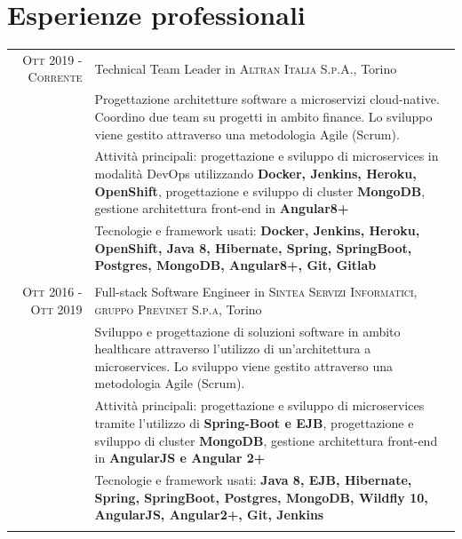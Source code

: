 \documentclass[a4paper,10pt]{article} %
\begin{document}

\section{Esperienze professionali}

\begin{tabular}{r|p{11cm}}
\textsc{Ott 2019 - Corrente} & Technical Team Leader in \textsc{Altran Italia S.p.A.}, Torino \emph{}\\
& \footnotesize{Progettazione architetture software a microservizi cloud-native. Coordino due team su progetti in ambito finance. Lo sviluppo viene gestito attraverso una metodologia Agile (Scrum).}\\
& \footnotesize{Attività principali: progettazione e sviluppo di microservices in modalità DevOps utilizzando \textbf{Docker, Jenkins, Heroku, OpenShift}, progettazione e sviluppo di cluster \textbf{MongoDB}, gestione architettura front-end in \textbf{Angular8+} }\\
& \footnotesize{Tecnologie e framework usati: \textbf{Docker, Jenkins, Heroku, OpenShift, Java 8, Hibernate, Spring, SpringBoot, Postgres, MongoDB, Angular8+, Git, Gitlab} }\\
\multicolumn{2}{c}{} \\


\textsc{Ott 2016 - Ott 2019} & Full-stack Software Engineer in \textsc{Sintea Servizi Informatici, gruppo Previnet S.p.a}, Torino \emph{}\\
& \footnotesize{Sviluppo e progettazione di soluzioni software in ambito healthcare attraverso l'utilizzo di un'architettura a microservices. Lo sviluppo viene gestito attraverso una metodologia Agile (Scrum). }\\
& \footnotesize{Attività principali: progettazione e sviluppo di microservices tramite l'utilizzo di \textbf{Spring-Boot e EJB}, progettazione e sviluppo di cluster \textbf{MongoDB}, gestione architettura front-end in \textbf{AngularJS e Angular 2+} }\\
& \footnotesize{Tecnologie e framework usati: \textbf{Java 8, EJB, Hibernate, Spring, SpringBoot, Postgres, MongoDB, Wildfly 10, AngularJS, Angular2+, Git, Jenkins} }\\
\multicolumn{2}{c}{} \\


\end{tabular}
\end{document}

